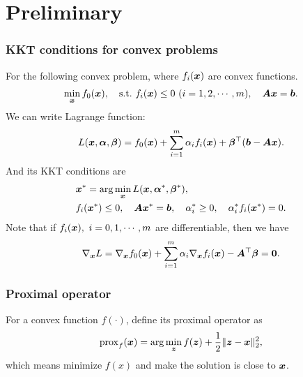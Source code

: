 \documentclass{beamer}
\begin{document}
\section{Preliminary}

\begin{frame}[fragile]
    \frametitle{KKT conditions for convex problems}
    For the following convex problem, where $f_i({\bm x})$ are convex functions.
    \begin{align}
        \min_{{\bm x}}f_0({\bm x}),\quad\mathrm{s.t.}~ f_i({\bm x})\leq 0~(i=1,2,\cdots,m),\quad{\bm A}{\bm x}={\bm b}.
    \end{align}
    We can write Lagrange function:
    \begin{equation*}
        L({\bm x},{\bm\alpha},{\bm\beta})=f_0({\bm x})+\sum_{i=1}^m\alpha_if_i({\bm x})+{\bm\beta}^\top({\bm b}-{\bm A}{\bm x}).
    \end{equation*}
    And its KKT conditions are
    \begin{align}
        &{\bm x}^*=\arg\min_{{\bm x}}L({\bm x},{\bm\alpha}^*,{\bm\beta}^*),\\
        &f_i({\bm x}^*)\leq 0,\quad {\bm A}{\bm x}^*={\bm b},\quad\alpha_i^*\geq 0,\quad\alpha_i^*f_i({\bm x}^*)=0.
    \end{align}
    Note that if $f_i({\bm x}),~i=0,1,\cdots,m$ are differentiable, then we have
    \begin{equation}
        \nabla_{{\bm x}} L=\nabla_{{\bm x}} f_0({\bm x})+\sum_{i=1}^m\alpha_i\nabla_{{\bm x}} f_i({\bm x}) -{\bm A}^\top{\bm\beta}=\bm0.
    \end{equation}
    \vspace{10pt}
\end{frame}

\begin{frame}[fragile]
    \frametitle{Proximal operator}
    For a convex function $f(\cdot)$, define its proximal operator as
    \begin{equation*}
        \mathrm{prox}_f({\bm x})=\arg\min_{{\bm z}}f({\bm z})+\frac12\|{\bm z}-{\bm x}\|_2^2,
    \end{equation*}
    which means minimize $f(x)$ and make the solution is close to ${\bm x}$.
\end{frame}
\end{document}
